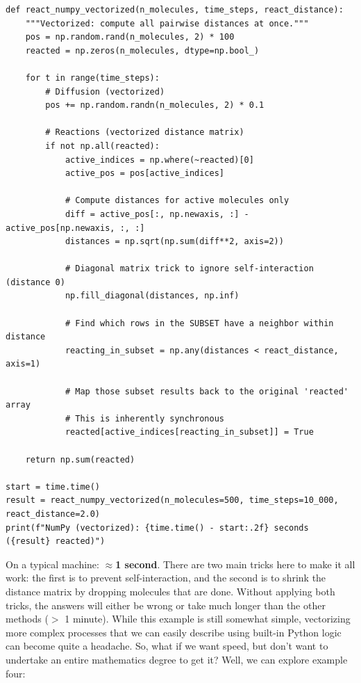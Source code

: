 \begin{lstlisting}
def react_numpy_vectorized(n_molecules, time_steps, react_distance):
    """Vectorized: compute all pairwise distances at once."""
    pos = np.random.rand(n_molecules, 2) * 100
    reacted = np.zeros(n_molecules, dtype=np.bool_)

    for t in range(time_steps):
        # Diffusion (vectorized)
        pos += np.random.randn(n_molecules, 2) * 0.1

        # Reactions (vectorized distance matrix)
        if not np.all(reacted):
            active_indices = np.where(~reacted)[0]
            active_pos = pos[active_indices]
            
            # Compute distances for active molecules only
            diff = active_pos[:, np.newaxis, :] - active_pos[np.newaxis, :, :]
            distances = np.sqrt(np.sum(diff**2, axis=2))

            # Diagonal matrix trick to ignore self-interaction (distance 0)
            np.fill_diagonal(distances, np.inf) 

            # Find which rows in the SUBSET have a neighbor within distance
            reacting_in_subset = np.any(distances < react_distance, axis=1)

            # Map those subset results back to the original 'reacted' array
            # This is inherently synchronous
            reacted[active_indices[reacting_in_subset]] = True

    return np.sum(reacted)

start = time.time()
result = react_numpy_vectorized(n_molecules=500, time_steps=10_000, react_distance=2.0)
print(f"NumPy (vectorized): {time.time() - start:.2f} seconds ({result} reacted)")

\end{lstlisting}

\noindent On a typical machine: \textbf{$\approx$1 second}. There are two main tricks here to make it all work: the first is to prevent self-interaction, and the second is to shrink the distance matrix by dropping molecules that are done. Without applying both tricks, the answers will either be wrong or take much longer than the other methods ($>$ 1 minute). While this example is still somewhat simple, vectorizing more complex processes that we can easily describe using built-in Python logic can become quite a headache. So, what if we want speed, but don't want to undertake an entire mathematics degree to get it? Well, we can explore example four:

